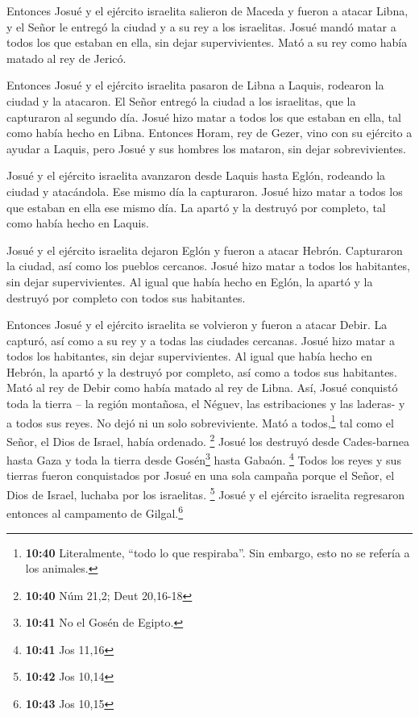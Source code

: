  Entonces Josué y el ejército israelita salieron de
Maceda y fueron a atacar Libna,  y el Señor le entregó la
ciudad y a su rey a los israelitas. Josué mandó matar a todos los que
estaban en ella, sin dejar supervivientes. Mató a su rey como había
matado al rey de Jericó.

 Entonces Josué y el ejército israelita pasaron de Libna
a Laquis, rodearon la ciudad y la atacaron.  El Señor
entregó la ciudad a los israelitas, que la capturaron al segundo día.
Josué hizo matar a todos los que estaban en ella, tal como había hecho
en Libna.  Entonces Horam, rey de Gezer, vino con su
ejército a ayudar a Laquis, pero Josué y sus hombres los mataron, sin
dejar sobrevivientes.

 Josué y el ejército israelita avanzaron desde Laquis
hasta Eglón, rodeando la ciudad y atacándola.  Ese mismo
día la capturaron. Josué hizo matar a todos los que estaban en ella ese
mismo día. La apartó y la destruyó por completo, tal como había hecho en
Laquis.

 Josué y el ejército israelita dejaron Eglón y fueron a
atacar Hebrón.  Capturaron la ciudad, así como los
pueblos cercanos. Josué hizo matar a todos los habitantes, sin dejar
supervivientes. Al igual que había hecho en Eglón, la apartó y la
destruyó por completo con todos sus habitantes.

 Entonces Josué y el ejército israelita se volvieron y
fueron a atacar Debir.  La capturó, así como a su rey y a
todas las ciudades cercanas. Josué hizo matar a todos los habitantes,
sin dejar supervivientes. Al igual que había hecho en Hebrón, la apartó
y la destruyó por completo, así como a todos sus habitantes. Mató al rey
de Debir como había matado al rey de Libna.  Así, Josué
conquistó toda la tierra -- la región montañosa, el Néguev, las
estribaciones y las laderas- y a todos sus reyes. No dejó ni un solo
sobreviviente. Mató a todos,\footnote{\textbf{10:40} Literalmente,
  ``todo lo que respiraba''. Sin embargo, esto no se refería a los
  animales.} tal como el Señor, el Dios de Israel, había ordenado.
\footnote{\textbf{10:40} Núm 21,2; Deut 20,16-18}  Josué
los destruyó desde Cades-barnea hasta Gaza y toda la tierra desde
Gosén\footnote{\textbf{10:41} No el Gosén de Egipto.} hasta Gabaón.
\footnote{\textbf{10:41} Jos 11,16}  Todos los reyes y
sus tierras fueron conquistados por Josué en una sola campaña porque el
Señor, el Dios de Israel, luchaba por los israelitas. \footnote{\textbf{10:42}
  Jos 10,14}  Josué y el ejército israelita regresaron
entonces al campamento de Gilgal.\footnote{\textbf{10:43} Jos 10,15}

